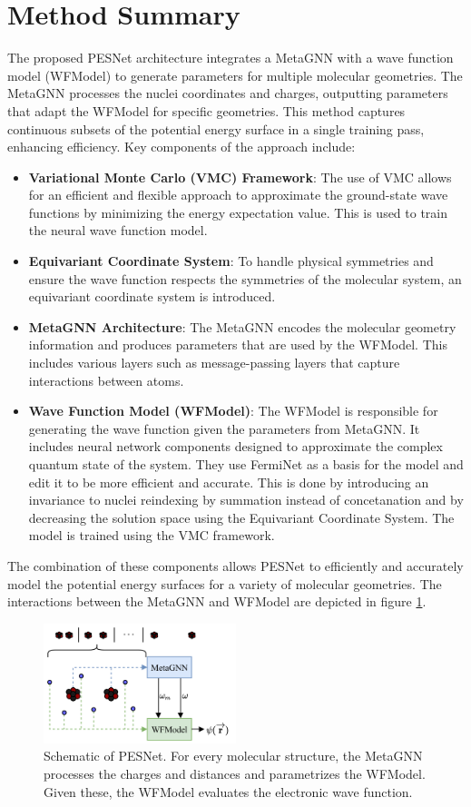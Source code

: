 \documentclass{article}
\begin{document}
\section{Method Summary}
The proposed PESNet architecture integrates a MetaGNN with a wave function model (WFModel) to generate parameters for multiple molecular geometries. The MetaGNN processes the nuclei coordinates and charges, outputting parameters that adapt the WFModel for specific geometries. This method captures continuous subsets of the potential energy surface in a single training pass, enhancing efficiency. Key components of the approach include:
\begin{itemize}
    \item \textbf{Variational Monte Carlo (VMC) Framework}: The use of VMC allows for an efficient and flexible approach to approximate the ground-state wave functions by minimizing the energy expectation value. This is used to train the neural wave function model.
    \item \textbf{Equivariant Coordinate System}: To handle physical symmetries and ensure the wave function respects the symmetries of the molecular system, an equivariant coordinate system is introduced.
    \item \textbf{MetaGNN Architecture}: The MetaGNN encodes the molecular geometry information and produces parameters that are used by the WFModel. This includes various layers such as message-passing layers that capture interactions between atoms.
    \item \textbf{Wave Function Model (WFModel)}: The WFModel is responsible for generating the wave function given the parameters from MetaGNN. It includes neural network components designed to approximate the complex quantum state of the system. They use FermiNet as a basis for the model and edit it to be more efficient and accurate. This is done by introducing an invariance to nuclei reindexing by summation instead of concetanation and by decreasing the solution space using the Equivariant Coordinate System. The model is trained using the VMC framework.
\end{itemize}
The combination of these components allows PESNet to efficiently and accurately model the potential energy surfaces for a variety of molecular geometries. The interactions between the MetaGNN and WFModel are depicted in figure \ref{fig:schematic}.

\begin{figure}[h]
    \centering
    \includegraphics[width=0.5\textwidth]{schematic_pesnet.png}
    \caption{Schematic of PESNet. For every molecular structure, the MetaGNN processes the charges and distances and parametrizes the WFModel. Given these, the WFModel evaluates the electronic wave function.}
    \label{fig:schematic}
\end{figure}
\end{document}
